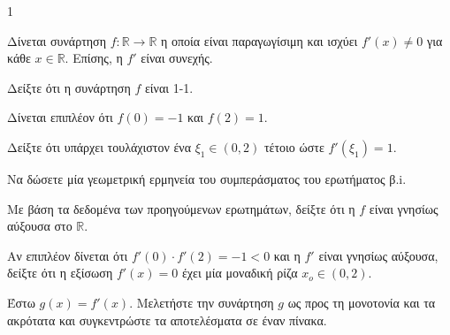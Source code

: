 \begin{ylh}{1}
    \item [Διαφορικός Λογισμός (Ρολ, ΘΜΤ, Μονοτονία, Ακρότατα)]
\end{ylh}
Δίνεται συνάρτηση $f: \mathbb{R} \to \mathbb{R}$ η οποία είναι παραγωγίσιμη και ισχύει $f'(x) \neq 0$ για κάθε $x \in \mathbb{R}$. Επίσης, η $f'$ είναι συνεχής.

\begin{alist}
\item Δείξτε ότι η συνάρτηση $f$ είναι 1-1. 

\item Δίνεται επιπλέον ότι $f(0)=-1$ και $f(2)=1$.
\begin{rlist}
\item Δείξτε ότι υπάρχει τουλάχιστον ένα $\xi_1 \in (0, 2)$ τέτοιο ώστε $f'(\xi_1) = 1$. 
\item Να δώσετε μία γεωμετρική ερμηνεία του συμπεράσματος του ερωτήματος β.i. 
\end{rlist}

\item
\begin{rlist}
\item Με βάση τα δεδομένα των προηγούμενων ερωτημάτων, δείξτε ότι η $f$ είναι γνησίως αύξουσα στο $\mathbb{R}$. 
\item Αν επιπλέον δίνεται ότι $f'(0) \cdot f'(2)=-1<0$ και η $f'$ είναι γνησίως αύξουσα, δείξτε ότι η εξίσωση $f'(x)=0$ έχει μία μοναδική ρίζα $x_o \in (0,2)$. 
\item Έστω $g(x) = f'(x)$. Μελετήστε την συνάρτηση $g$ ως προς τη μονοτονία και τα ακρότατα και συγκεντρώστε τα αποτελέσματα σε έναν πίνακα. 
\end{rlist}
\end{alist}